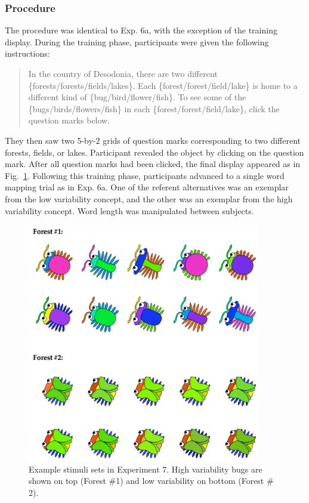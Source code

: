 \subsubsection{Procedure}
The procedure was identical to Exp. 6a, with the exception of the training display. During the training phase, participants were given the following instructions:

\begin{quote}
In the country of Desodonia, there are two different \{forests/forests/fields/lakes\}. Each \{forest/forest/field/lake\}  is home to a different kind of \{bug/bird/flower/fish\}. To see some of the \{bugs/birds/flowers/fish\} in each \{forest/forest/field/lake\}, click the question marks below.
\end{quote}

They then saw two 5-by-2 grids of question marks corresponding to two different forests, fields, or lakes. Participant revealed the object by clicking on the question mark. After all question marks had been clicked, the final display appeared as in Fig.\ \ref{fig:var_screen_shot}. Following this training phase, participants advanced to a single word mapping trial as in Exp. 6a. One of the referent alternatives was an exemplar from the low variability concept, and the other was an exemplar from the high variability concept. Word length was manipulated between subjects.

  \begin{figure}[t!]
 \begin{center}
  \includegraphics[width=4in]{figs/var_screen_shot.png}
  \caption{\label{fig:var_screen_shot} Example stimuli sets in Experiment 7. High variability bugs are shown on top (Forest \#1) and low variability on bottom (Forest \# 2).}
 \end{center}
\end{figure}

